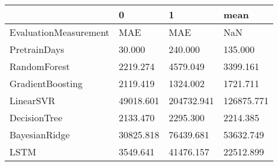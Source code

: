 \begin{tabular}{llll}
\toprule
{} &          0 &           1 &        mean \\
\midrule
EvaluationMeasurement &        MAE &         MAE &         NaN \\
PretrainDays          &     30.000 &     240.000 &     135.000 \\
RandomForest          &   2219.274 &    4579.049 &    3399.161 \\
GradientBoosting      &   2119.419 &    1324.002 &    1721.711 \\
LinearSVR             &  49018.601 &  204732.941 &  126875.771 \\
DecisionTree          &   2133.470 &    2295.300 &    2214.385 \\
BayesianRidge         &  30825.818 &   76439.681 &   53632.749 \\
LSTM                  &   3549.641 &   41476.157 &   22512.899 \\
\bottomrule
\end{tabular}
